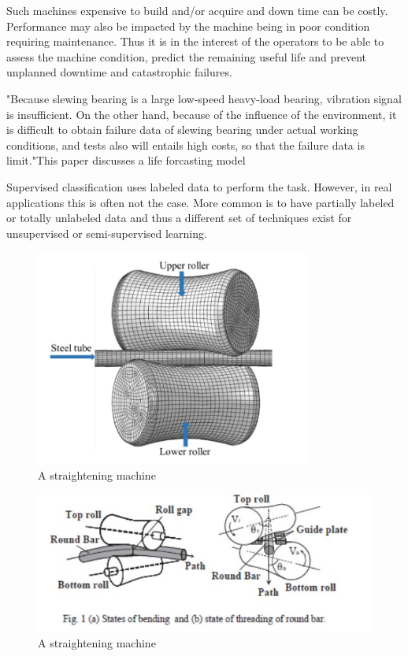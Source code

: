 \documentclass{article}
\begin{document}
Such machines expensive to build and/or acquire and down time can be costly. Performance may also be impacted by the machine being in poor condition requiring maintenance. Thus it is in the interest of the operators to be able to assess the machine condition, predict the remaining useful life and prevent unplanned downtime and catastrophic failures.

"Because slewing bearing is a large low-speed heavy-load bearing, vibration signal is insufficient. On the other hand, because of the influence of the
environment, it is difficult to obtain failure data of slewing bearing under actual working conditions, and tests also will entails high costs, so that the failure data is limit."This paper discusses a life forcasting model~\cite{wang2016multiple}

Supervised classification uses labeled data to perform the task. However, in real applications this is often not the case. More common is to have partially labeled or totally unlabeled data and thus a different set of techniques exist for unsupervised or semi-supervised learning.

\begin{figure}[H]
	\centering
	\includegraphics[width=90mm, keepaspectratio]{straightening2.png}
	\caption{A straightening machine~\cite{ma2020effect}}
	\label{straighteningImage2}
\end{figure}

\begin{figure}[H]
	\centering
	\includegraphics[]{straightening1.jpg}
	\caption{A straightening machine~\cite{kato2014straightening}}
	\label{straighteningImage1}
\end{figure}
\end{document}
